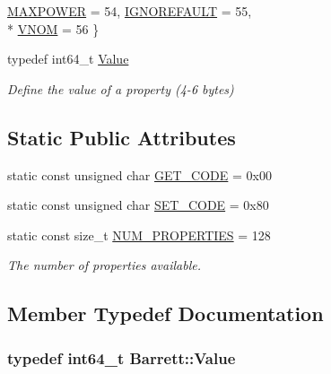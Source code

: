 \begin{DoxyCompactItemize}
\hyperlink{struct_barrett_a317dfaed9982ffc28166e537d774bd16a20b434dfd051fcbe27d1bd12fb161ae6}{M\+A\+X\+P\+O\+W\+E\+R} = 54, 
\hyperlink{struct_barrett_a317dfaed9982ffc28166e537d774bd16a782bc07a01d45831942deff61bfe8da8}{I\+G\+N\+O\+R\+E\+F\+A\+U\+L\+T} = 55, 
\\*
\hyperlink{struct_barrett_a317dfaed9982ffc28166e537d774bd16ae504abf13f6ff4532d56098d89d748f5}{V\+N\+O\+M} = 56
 \}
\item 
typedef int64\+\_\+t \hyperlink{struct_barrett_a57ff132885344ca62e4b4b691885685b}{Value}
\begin{DoxyCompactList}\small\item\em Define the value of a property (4-\/6 bytes) \end{DoxyCompactList}\end{DoxyCompactItemize}
\subsection*{Static Public Attributes}
\begin{DoxyCompactItemize}
\item 
static const unsigned char \hyperlink{struct_barrett_ad52fc21a0b1d02fa2dfd0b9f47c63439}{G\+E\+T\+\_\+\+C\+O\+D\+E} = 0x00
\item 
static const unsigned char \hyperlink{struct_barrett_a746e1d4f09073391ae23fecb646ab0f9}{S\+E\+T\+\_\+\+C\+O\+D\+E} = 0x80
\item 
static const size\+\_\+t \hyperlink{struct_barrett_a3b28e2fed33c0ad184808bbed86551c0}{N\+U\+M\+\_\+\+P\+R\+O\+P\+E\+R\+T\+I\+E\+S} = 128
\begin{DoxyCompactList}\small\item\em The number of properties available. \end{DoxyCompactList}\end{DoxyCompactItemize}


\subsection{Member Typedef Documentation}
\hypertarget{struct_barrett_a57ff132885344ca62e4b4b691885685b}{}
\subsubsection[{Value}]{\setlength{\rightskip}{0pt plus 5cm}typedef int64\+\_\+t {\bf Barrett\+::\+Value}}\label{struct_barrett_a57ff132885344ca62e4b4b691885685b}


